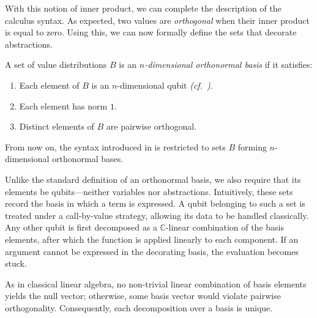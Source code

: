 \documentclass[runningheads,orivec,envcountsame,envcountsect]{llncs}
\providecommand{\qed}{\hbox{\rule{1ex}{1ex}}}%
\def\C{\mathbb{C}}            %
\begin{document}
With this notion of inner product, we can complete the description of the
calculus syntax. As expected, two values are \emph{orthogonal} when their inner
product is equal to zero. Using this, we can now formally define the sets that
decorate abstractions.
\begin{definition}[Basis]\label{def:NthDimensionalBasis}
  A set of value distributions $B$ is an \emph{$n$-dimensional orthonormal
  basis} if it satisfies:
  \begin{enumerate}
    \item Each element of $B$ is an $n$-dimensional qubit \emph{(cf.~)}.
    \item Each element has norm $1$.
    \item Distinct elements of $B$ are pairwise orthogonal.
  \end{enumerate}
\end{definition}

From now on, the syntax introduced in 
is restricted to sets $B$ forming $n$-dimensional
orthonormal bases.


Unlike the standard definition of an orthonormal basis, we also require that
its elements be qubits—neither variables nor abstractions. Intuitively, these
sets record the basis in which a term is expressed. A qubit belonging to such a
set is treated under a call-by-value strategy, allowing its data to be handled
classically. Any other qubit is first decomposed as a $\C$-linear combination
of the basis elements, after which the function is applied linearly to each
component. If an argument cannot be expressed in the decorating basis, the
evaluation becomes stuck.

As in classical linear algebra, no non-trivial linear combination of basis
elements yields the null vector; otherwise, some basis vector would violate
pairwise orthogonality. Consequently, each decomposition over a basis is
unique.


\end{document}
